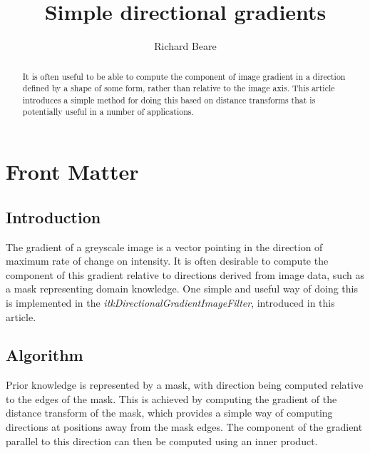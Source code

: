 \documentclass{InsightArticle}
\title{Simple directional gradients}
\author{Richard Beare}
\newcommand{\IJhandlerIDnumber}{3265}
\begin{document}
\IJhandlefooter{\IJhandlerIDnumber}

\maketitle

\ifhtml
\chapter*{Front Matter\label{front}}
\fi


\begin{abstract}
\noindent
It is often useful to be able to compute the component of image
gradient in a direction defined by a shape of some form, rather than
relative to the image axis. This article introduces a simple method
for doing this based on distance transforms that is potentially useful
in a number of applications.
\end{abstract}

\tableofcontents

\section{Introduction}
The gradient of a greyscale image is a vector pointing in the
direction of maximum rate of change on intensity. It is often
desirable to compute the component of this gradient relative to
directions derived from image data, such as a mask representing domain
knowledge. One simple and useful way of doing this is implemented in
the {\em itkDirectionalGradientImageFilter}, introduced in this
article.

\section{Algorithm}
Prior knowledge is represented by a mask, with direction being
computed relative to the edges of the mask. This is achieved by
computing the gradient of the distance transform of the mask, which
provides a simple way of computing directions at positions away from
the mask edges. The component of the gradient parallel to this
direction can then be computed using an inner product.
\end{document}
